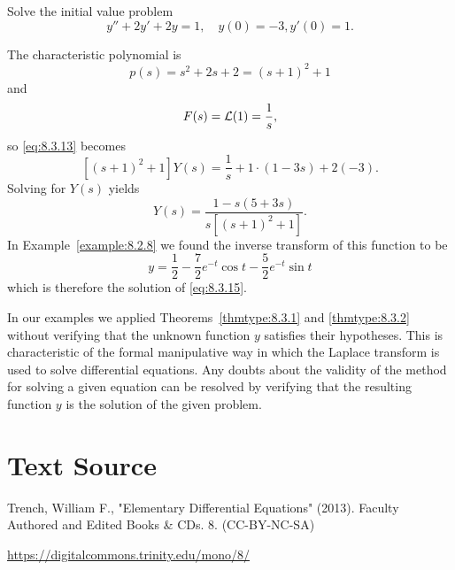 \documentclass{ximera}
\begin{document}
\begin{example}\label{example:8.3.4}
 Solve the initial value problem
\begin{equation}\label{eq:8.3.15}
y''+2y'+2y=1, \quad   y(0)=-3,  y'(0)=1.
\end{equation}
\begin{explanation}
The characteristic polynomial is
$$
p(s)=s^2+2s+2=(s+1)^2+1
$$
and
$$
F(s)={\cal L}(1)=\frac{1}{s},
$$
so \eqref{eq:8.3.13} becomes
$$
\left[(s+1)^2+1\right] Y(s)=\frac{1}{s}+1\cdot(1-3s)+2(-3).
$$
Solving for $Y(s)$ yields
$$
Y(s)=\frac{1-s(5+3s)}{s\left[(s+1)^2+1\right]}.
$$
In Example~\ref{example:8.2.8}  we found the inverse transform of this
function to be
$$
y=\frac{1}{2}-\frac{7}{2}e^{-t}\cos t-\frac{5}{2}e^{-t}\sin t
$$
which is therefore  the solution of  \eqref{eq:8.3.15}.

\begin{center}
\end{center}


\end{explanation}
\end{example}

\begin{remark}
In our examples we applied Theorems~\ref{thmtype:8.3.1} and
\ref{thmtype:8.3.2}
without verifying that the unknown function $y$ satisfies their
hypotheses. This is characteristic of the formal manipulative way in
which the Laplace transform is used to solve differential equations.
Any doubts about the validity of the method for solving a given
equation can be resolved by verifying that the resulting function $y$
is  the solution of the given problem.
\end{remark}


\section*{Text Source}
Trench, William F., "Elementary Differential Equations" (2013). Faculty Authored and Edited Books \& CDs. 8. (CC-BY-NC-SA)

\href{https://digitalcommons.trinity.edu/mono/8/}{https://digitalcommons.trinity.edu/mono/8/}
\end{document}

